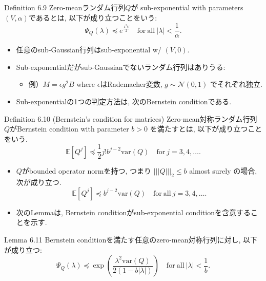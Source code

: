 \documentclass[unicode,aspectratio=169,11pt]{beamer}
\newcommand{\ex}{\mathbb{E}}
\newcommand{\var}{\mathrm{var}}
\newcommand{\cc}{\mathcal}
\begin{document}
\begin{frame}{}{}
  \begin{block}{Definition 6.9}
    Zero-meanランダム行列$Q$が sub-exponential with parameters $(V, \alpha)$であるとは, 以下が成り立つことをいう:
    \[
        \Psi_Q(\lambda) \preceq e^{\frac{\lambda^2 V}{2}} \quad \mathrm{for\ all}\ |\lambda| < \frac{1}{\alpha}.
        \tag{6.28}
    \]
  \end{block}
  \begin{itemize}
    \item 任意のsub-Gaussian行列はsub-exponential w/ $(V, 0)$.
    \item Sub-exponentialだがsub-Gaussianでないランダム行列はありうる:
    \begin{itemize}
      \item 例）$M = \epsilon g^2 B$ where $\epsilon$はRademacher変数, $g \sim \cc{N}(0, 1)$ でそれぞれ独立.
    \end{itemize}
  \end{itemize}
\end{frame}

\begin{frame}
  \begin{itemize}
    \item Sub-exponentialの1つの判定方法は, 次のBernstein conditionである.
  \end{itemize}
  \begin{block}{Definition 6.10 (Bernstein's condition for matrices)}
    Zero-mean対称ランダム行列$Q$がBernstein condition with parameter $b >0$ を満たすとは, 以下が成り立つことをいう.
    \[
      \ex[Q^j] \preceq \frac{1}{2}j! b^{j-2} \var(Q) \quad \mathrm{for}\ j=3,4,\dots .
      \tag{6.29}
    \]
  \end{block}
  \begin{itemize}
    \item $Q$がbounded operator normを持つ, つまり $|||Q|||_2 \le b$ almost surely の場合, 次が成り立つ.
          \[ \ex[Q^j] \preceq b^{j - 2} \var(Q) \quad \mathrm{for\ all}\ j=3,4,\dots.\tag{6.30} \]
  \end{itemize}
\end{frame}

\begin{frame}{}{}
  \begin{itemize}
    \item 次のLemmaは, Bernstein conditionがsub-exponential conditionを含意することを示す.
  \end{itemize}
  \begin{block}{Lemma 6.11}
    Bernstein conditionを満たす任意のzero-mean対称行列に対し, 以下が成り立つ:
    \[
      \Psi_Q(\lambda) \preceq \exp\left( \frac{\lambda^2 \var(Q)}{2(1 - b |\lambda|)} \right)
      \quad \mathrm{for\ all}\ |\lambda| < \frac{1}{b}.
      \tag{6.31}
    \]
  \end{block}
\end{frame}
\end{document}

